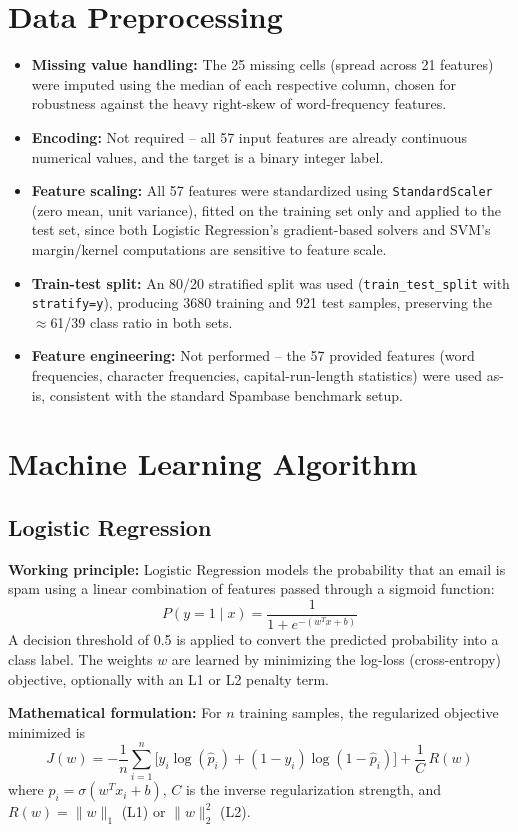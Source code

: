 \documentclass[12pt,a4paper]{article}
\begin{document}
\section{Data Preprocessing}
\begin{itemize}
\item \textbf{Missing value handling:} The 25 missing cells (spread across 21
features) were imputed using the median of each respective column, chosen for
robustness against the heavy right-skew of word-frequency features.
\item \textbf{Encoding:} Not required -- all 57 input features are already
continuous numerical values, and the target is a binary integer label.
\item \textbf{Feature scaling:} All 57 features were standardized using
\texttt{StandardScaler} (zero mean, unit variance), fitted on the training set
only and applied to the test set, since both Logistic Regression's gradient-based
solvers and SVM's margin/kernel computations are sensitive to feature scale.
\item \textbf{Train-test split:} An 80/20 stratified split was used
(\texttt{train\_test\_split} with \texttt{stratify=y}), producing 3680 training
and 921 test samples, preserving the $\approx$61/39 class ratio in both sets.
\item \textbf{Feature engineering:} Not performed -- the 57 provided features
(word frequencies, character frequencies, capital-run-length statistics) were
used as-is, consistent with the standard Spambase benchmark setup.
\end{itemize}

\section{Machine Learning Algorithm}

\subsection*{Logistic Regression}
\textbf{Working principle:} Logistic Regression models the probability that an
email is spam using a linear combination of features passed through a sigmoid
function:
\[
P(y=1\mid x) = \frac{1}{1 + e^{-(w^Tx + b)}}
\]
A decision threshold of 0.5 is applied to convert the predicted probability into
a class label. The weights $w$ are learned by minimizing the log-loss
(cross-entropy) objective, optionally with an L1 or L2 penalty term.

\textbf{Mathematical formulation:} For $n$ training samples, the regularized
objective minimized is
\[
J(w) = -\frac{1}{n}\sum_{i=1}^{n}\Big[y_i\log(\hat{p}_i) + (1-y_i)\log(1-\hat{p}_i)\Big] + \frac{1}{C}\,R(w)
\]
where $\hat{p}_i = \sigma(w^Tx_i+b)$, $C$ is the inverse regularization strength,
and $R(w) = \|w\|_1$ (L1) or $\|w\|_2^2$ (L2).
\end{document}
